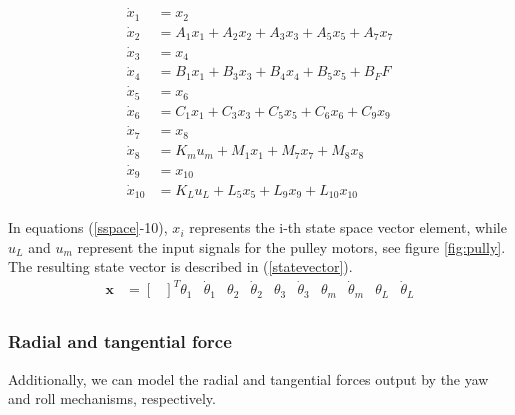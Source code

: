 

\begin{gather}\label{sspace}
\begin{align}
\dot{x}_1 &= x_2\\
\dot{x}_2 &= A_1x_1 + A_2x_2 + A_3x_3 + A_5x_5 + A_7x_7\\
\dot{x}_3 &= x_4\\
\dot{x}_4 &= B_1x_1 + B_3x_3 + B_4x_4 + B_5x_5 + B_FF\\
\dot{x}_5 &= x_6\\
\dot{x}_6 &= C_1x_1 + C_3x_3 + C_5x_5 + C_6x_6 + C_9x_9\\
\dot{x}_7 &= x_8\\
\dot{x}_8 &= K_mu_m + M_1x_1 + M_7x_7 + M_8x_8\\
\dot{x}_9 &= x_{10}\\
\dot{x}_{10} &= K_Lu_L + L_5x_5 + L_9x_9 + L_{10}x_{10}
\end{align}
\end{gather}


In equations (\ref{sspace}-10), $x_i$ represents the i-th state space vector element, while $u_L$ and $u_m$ represent the input signals for the pulley motors, see figure \ref{fig:pully}.
The resulting state vector is described in (\ref{statevector}).
\begin{align} \label{statevector}
\mathbf{x} &=
\begin{bmatrix}
\end{bmatrix}^T\theta_1 &\dot{\theta}_1 &\theta_2 &\dot{\theta}_2 &\theta_3 &\dot{\theta}_3 &\theta_m &\dot{\theta}_m &\theta_L &\dot{\theta}_L \\
\end{align}

\subsubsection{Radial and tangential force}
Additionally, we can model the radial and tangential forces output by the yaw and roll mechanisms, respectively.

